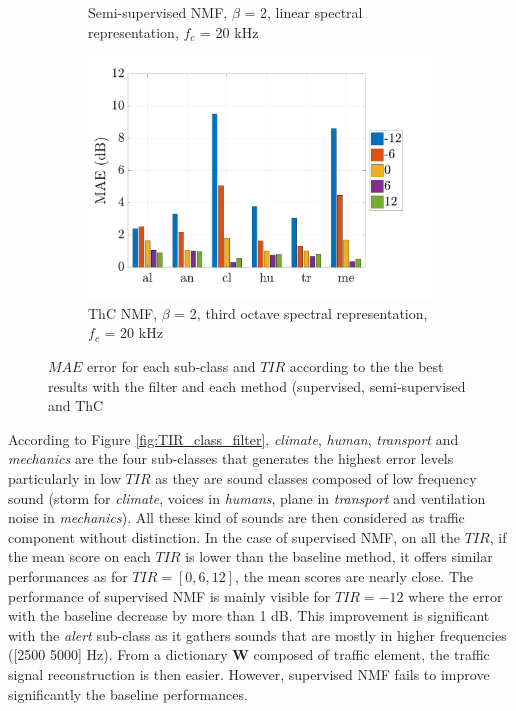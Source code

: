 \documentclass[twocolumn,a4paper,10pt]{article}
\begin{document}
\begin{figure}
    \begin{subfigure}[t]{0.45\textwidth}
        \centering
        \caption{Semi-supervised NMF, $\beta$ = 2, linear spectral representation, $f_c$ = 20 kHz}
                \label{fig:TIR_class_semi}
    \end{subfigure}%
    \hfill
    \begin{subfigure}[t]{0.45\textwidth}
        \centering
        \includegraphics[width=\linewidth]{figures/THC_bar}
        \caption{ThC NMF, $\beta$ = 2, third octave spectral representation, $f_c$ = 20 kHz}
        \label{fig:TIR_class_thc}
    \end{subfigure}
    \caption{$MAE$ error for each sub-class and $TIR$ according to the the best results with the filter and each method (supervised, semi-supervised and ThC}
\end{figure}

According to Figure \ref{fig:TIR_class_filter}, \textit{climate}, \textit{human}, \textit{transport} and \textit{mechanics} are the four sub-classes that generates the highest error levels particularly in low $TIR$ as they are sound classes composed of low frequency sound (storm for \textit{climate}, voices in \textit{humans}, plane in \textit{transport} and ventilation noise in \textit{mechanics}). All these kind of sounds are then considered as traffic component without distinction.
In the case of supervised NMF, on all the $TIR$, if the mean score on each $TIR$ is lower than the baseline method, it offers similar performances as for $TIR = [0, 6, 12]$, the mean scores are nearly close. The performance of supervised NMF is mainly visible for $TIR = -12$ where the error with the baseline decrease by more than 1 dB. This improvement is significant with the \textit{alert} sub-class as it gathers sounds that are mostly in higher frequencies ([2500 5000] Hz). From a dictionary $\mathbf{W}$ composed of traffic element, the traffic signal reconstruction is then easier. However, supervised NMF fails to improve significantly the baseline performances.
\end{document}
